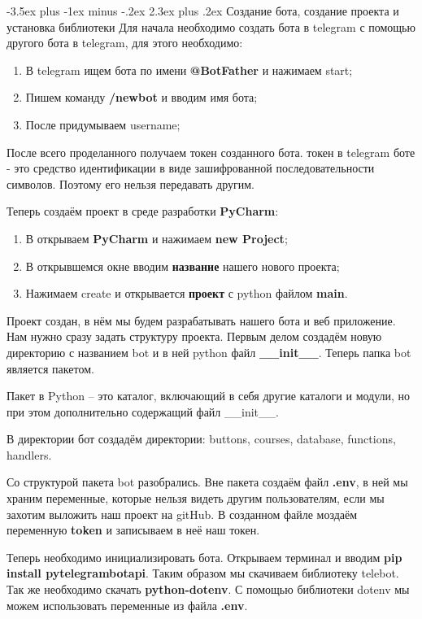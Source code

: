 \documentclass[12pt, oldlfont, amsfonts]{report}
\makeatletter
\renewcommand{\section}{\@startsection{section}{1}{0pt}%
                                {-3.5ex plus -1ex minus -.2ex}%
                                {2.3ex plus .2ex}%
{\centering\hyphenpenalty=10000\normalfont\Large\bfseries}}
\makeatother
\begin{document}
\section{Создание бота, создание проекта и установка библиотеки}
Для начала необходимо создать бота в telegram с помощью другого бота в telegram, для этого необходимо: 

\begin{enumerate}
\item В telegram ищем бота по имени {\bf @BotFather} и нажимаем start;
\item Пишем команду {\bf /newbot} и вводим имя бота;
\item После придумываем username;
\end{enumerate}	

После всего проделанного получаем токен созданного бота. токен в telegram боте - это средство идентификации в виде зашифрованной последовательности символов. Поэтому его нельзя передавать другим.

Теперь создаём проект в среде разработки {\bf PyCharm}:
\begin{enumerate}
\item В открываем {\bf PyCharm} и нажимаем {\bf new Project};
\item В открывшемся окне вводим {\bf название} нашего нового проекта;
\item Нажимаем create и открывается {\bf проект} с python файлом {\bf main}.
\end{enumerate}

Проект создан, в нём мы будем разрабатывать нашего бота и веб приложение. Нам нужно сразу задать структуру проекта. Первым делом создадём новую директорию с названием bot и в ней python файл {\bf \_\_init\_\_}. Теперь папка bot является пакетом.

Пакет в Python – это каталог, включающий в себя другие каталоги и модули, но при этом дополнительно содержащий файл \_\_init\_\_.

В директории бот создадём директории: buttons, courses, database, functions, handlers.

Со структурой пакета bot разобрались. Вне пакета создаём файл {\bf .env}, в ней мы храним переменные, которые нельзя видеть другим пользователям, если мы захотим выложить наш проект на gitHub. В созданном файле моздаём переменную {\bf token} и записываем в неё наш токен. 

Теперь необходимо инициализировать бота. Открываем терминал и вводим {\bf pip install pytelegrambotapi}. Таким образом мы скачиваем библиотеку telebot. Так же необходимо скачать {\bf python-dotenv}. С помощью библиотеки dotenv мы можем использовать переменные из файла {\bf .env}.
\end{document}
